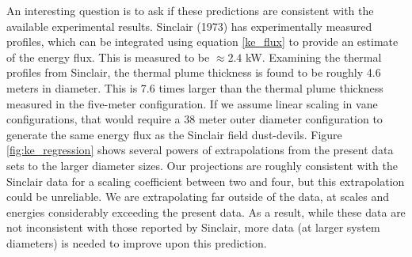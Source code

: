 \documentclass[english]{article}
\begin{document}
An interesting question is to ask if these predictions are consistent with the available experimental results. 
Sinclair (1973) has experimentally measured profiles, which can be integrated using equation \ref{ke_flux} to 
provide an estimate of the energy flux. This is measured to be $\approx 2.4$ kW. Examining the thermal 
profiles from Sinclair, the thermal plume thickness is found to be roughly 4.6 meters in diameter. This is 
7.6 times larger than the thermal plume thickness measured in the five-meter configuration. If we assume 
linear scaling in vane configurations, that would require a 38 meter outer diameter configuration to 
generate the same energy flux as the Sinclair field dust-devils. Figure \ref{fig:ke_regression} shows 
several powers of extrapolations from the present data sets to the larger diameter sizes. Our projections 
are roughly consistent with the Sinclair data for a scaling coefficient between two and four, but this extrapolation
could be unreliable. We are extrapolating far outside of the data, at scales and energies considerably 
exceeding the present data. As a result, while these data are not inconsistent with those reported by Sinclair, 
more data (at larger system diameters) is needed to improve upon this prediction. 
\end{document}
